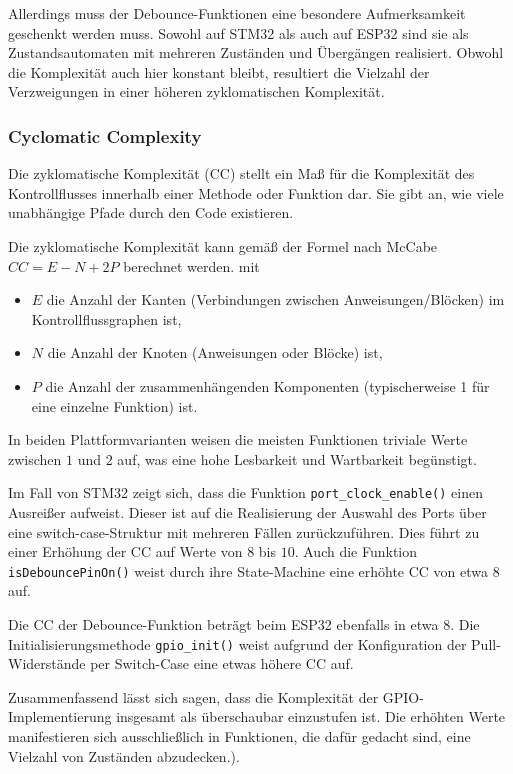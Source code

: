 Allerdings muss der Debounce-Funktionen eine besondere Aufmerksamkeit geschenkt werden muss. 
Sowohl auf STM32 als auch auf ESP32 sind sie als Zustandsautomaten mit mehreren Zuständen und Übergängen realisiert.
Obwohl die Komplexität auch hier konstant bleibt, resultiert die Vielzahl der Verzweigungen in einer höheren zyklomatischen Komplexität.

\subsubsection{Cyclomatic Complexity}
Die zyklomatische Komplexität (CC) stellt ein Maß für die Komplexität des Kontrollflusses innerhalb einer Methode oder Funktion dar. Sie gibt an, wie viele unabhängige Pfade durch den Code existieren. 

Die zyklomatische Komplexität kann gemäß der Formel nach McCabe $CC= E - N + 2P$ berechnet werden.
mit 
\begin{itemize}
	\item $E$ die Anzahl der Kanten (Verbindungen zwischen Anweisungen/Blöcken) im Kontrollflussgraphen ist,
	\item $N$ die Anzahl der Knoten (Anweisungen oder Blöcke) ist,
	\item $P$ die Anzahl der zusammenhängenden Komponenten (typischerweise 1 für eine einzelne Funktion) ist.
\end{itemize}

In beiden Plattformvarianten weisen die meisten Funktionen triviale Werte zwischen $1$ und $2$ auf, was eine hohe Lesbarkeit und Wartbarkeit begünstigt.

Im Fall von STM32 zeigt sich, dass die Funktion \texttt{port\_clock\_enable()} einen Ausreißer aufweist. 
Dieser ist auf die Realisierung der Auswahl des Ports über eine switch-case-Struktur mit mehreren Fällen zurückzuführen. 
Dies führt zu einer Erhöhung der CC auf Werte von $8$ bis $10$. 
Auch die Funktion \texttt{isDebouncePinOn()} weist durch ihre State-Machine eine erhöhte CC von etwa $8$ auf.

Die CC der Debounce-Funktion beträgt beim ESP32 ebenfalls in etwa $8$. 
Die Initialisierungsmethode \texttt{gpio\_init()} weist aufgrund der Konfiguration der Pull-Widerstände per Switch-Case eine etwas höhere CC auf.

Zusammenfassend lässt sich sagen, dass die Komplexität der GPIO-Implementierung insgesamt als überschaubar einzustufen ist. 
Die erhöhten Werte manifestieren sich ausschließlich in Funktionen, die dafür gedacht sind, eine Vielzahl von Zuständen abzudecken.).

